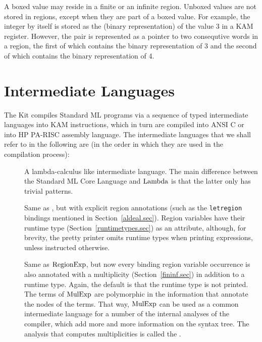 \documentclass[12pt]{book}
\begin{document}
A boxed value may reside in a finite or an infinite region.
Unboxed values are not stored in regions, except when they
are part of a boxed value. For example, the integer  by itself
is stored as the (binary representation) of the value 3 in a
KAM register. However, the pair  is represented as a
pointer to two consequtive words in a region, the first of which contains
the binary representation of 3 and the second of which contains the binary
representation of 4.

\section{Intermediate Languages}
The Kit compiles Standard ML programs via a sequence of typed intermediate 
languages into  KAM instructions, which in turn are compiled into ANSI C or into HP 
PA-RISC assembly language.
The intermediate languages that
we shall refer to in the following are (in the order in which they are used in the
compilation process):
\begin{description}
\item[\Lam] A lambda-calculus like intermediate language. The main difference between
  the Standard ML Core Language and $\hbox{\rm Lambda}$ is that the latter only has trivial patterns.
\item[\RegExp] Same as \Lam, 
but with explicit region annotations (such as the {\tt letregion} bindings
mentioned in Section~\ref{aldeal.sec}). Region variables have their runtime type (Section~\ref{runtimetypes.sec})
as an attribute, although, for brevity, the pretty printer omits runtime types when printing expressions, 
unless instructed otherwise.
\item[\MulExp] Same as $\hbox{\rm RegionExp}$, but now every binding region variable occurrence
is also annotated with a multiplicity (Section~\ref{fininf.sec}) in addition to a runtime type.
Again, the default is that the runtime type is not printed. The terms of $\hbox{\rm MulExp}$ are polymorphic 
in the information that annotate the nodes of the terms. That way, $\hbox{\rm MulExp}$ can be used
as a common intermediate language for a number of the internal analyses of the compiler, which
add more and more information on the syntax tree.
The analysis that computes multiplicities is called the .
\end{description}
\end{document}
